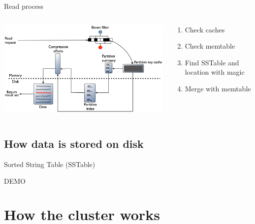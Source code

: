 \documentclass[
  10pt
]{beamer}
\begin{document}
\begin{frame}{Read process \cite{datastaxReadData}}
  \begin{columns}
    \begin{column}{0.4\textwidth}
      \includegraphics[width=\columnwidth]{resources/local_read.png}

    \end{column}

    \begin{column}{0.6\textwidth}
      \begin{enumerate}
        \item Check caches
        \item Check memtable
        \item Find SSTable and location with magic
        \item Merge with memtable
      \end{enumerate}
    \end{column}
  \end{columns}
\end{frame}

\subsection{How data is stored on disk}  %

\begin{frame}{Sorted String Table (SSTable)}
  \begin{center}
    \Huge DEMO
  \end{center}
\end{frame}

\section{How the cluster works}  %
\end{document}
